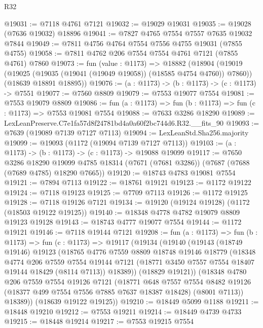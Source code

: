 \begin{lexlean}{R32}
\begin{coremodule}
@19031 := @7118 @4761 @7121
@19032 := @19029 @19031
@19035 := @19028 (@7636 @19032) @18896
@19041 := @7827 @4765 @7554 @7557 @7635 @19032 @7844
@19049 := @7811 @4756 @4764 @7554 @7556 @4755 @19031 (@7855 @4755)
@19058 := @7811 @4762 @206 @7554 @7554 @4761 @7121 (@7855 @4761) @7860
@19073 := fun (value : @1173) =>
  @18882
    (@18904
      (@19019 (@19025 (@19035 (@19041 (@19049 @19058)) (@18585 @4754 @4760)) @7860))
      (@18639 @18891 @18895))
@19076 := (a : @1173) -> (b : @1173) -> (c : @1173) -> @7551
@19077 := @7560 @8809
@19079 := @7553 @19077 @7554
@19081 := @7553 @19079 @8809
@19086 := fun (a : @1173) => fun (b : @1173) => fun (c : @1173) => @7553 @19081 @7554
@19088 := @7633 @3286 @18290
@19089 := LexLeanPreserve.C7e1fa57d8f24781bd4a0a60f2bc744d6.R32.__fits_90
@19093 := @7639 (@19089 @7139 @7127 @7113)
@19094 := LexLeanStd.Sha256.majority
@19099 := @19093 (@1172 (@19094 @7139 @7127 @7113))
@19103 := (a : @1173) -> (b : @1173) -> (c : @1173) -> @19088 @19099
@19117 := @7650
    @3286
    @18290
    @19099
    @4785
    @18314
    (@7671 (@7681 @3286))
    (@7687 (@7688 (@7689 @4785) @18290 @7665))
@19120 := @18743 @4783 @19081 @7554
@19121 := @7894 @7113
@19122 := @18761 @19121
@19123 := @1172 @19122
@19124 := @7118 @19123
@19125 := @7709 @7113
@19126 := @1172 @19125
@19128 := @7118 @19126 @7121
@19134 := @19120 (@19124 @19128) (@1172 (@18503 @19122 @19125))
@19140 := @18348 @4778 @4782 @19079 @8809 @19123 @19128
@19143 := @18743 @4777 @19077 @7554
@19144 := @1172 @19121
@19146 := @7118 @19144 @7121
@19208 := fun (a : @1173) =>
  fun (b : @1173) =>
  fun (c : @1173) =>
  @19117
    (@19134
      (@19140
        (@19143
          (@18749 @19146)
          @19123
          (@18765
            @4776
            @7559
            @8809
            @18748
            @19146
            @18779
            (@18348
              @4774
              @206
              @7559
              @7554
              @19144
              @7121
              (@18771 @3450 @7557 @7554 @18407 @19144 @18429 (@8114 @7113))
              @18389))
          (@18829 @19121))
        (@18348
          @4780
          @206
          @7559
          @7554
          @19126
          @7121
          (@18771
            @648
            @7557
            @7554
            @8482
            @19126
            (@18377 @499 @7554 @7556 @7885 @7637 @18387 @18428)
            (@8001 @7113))
          @18389))
      (@18639 @19122 @19125))
@19210 := @18449 @5099 @1188
@19211 := @18448 @19210
@19212 := @7553 @19211
@19214 := @18449 @4739 @4733
@19215 := @18448 @19214
@19217 := @7553 @19215 @7554

\end{coremodule}
\end{lexlean}
